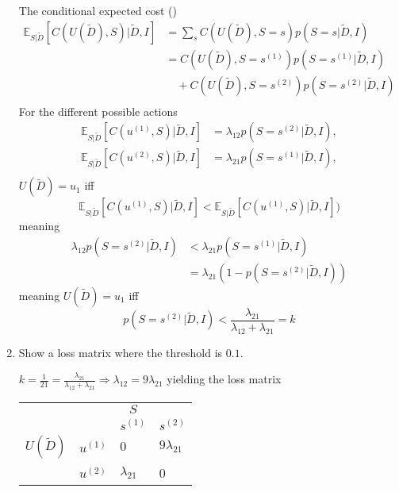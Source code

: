 \begin{example}
\begin{enumerate}
		The conditional expected cost ()
		\begin{equation}
			\begin{split}
				\mathbb{E}_{S|\tilde{D}}[C(U(\tilde{D}), S)|\tilde{D},I] & = \sum_sC(U(\tilde{D}),S=s)p(S=s|\tilde{D},I)\\
				& = C(U(\tilde{D}),S=s^{(1)})p(S=s^{(1)}|\tilde{D},I)\\
				& \quad+C(U(\tilde{D}),S=s^{(2)})p(S=s^{(2)}|\tilde{D},I)\\
			\end{split}
		\end{equation}
		For the different possible actions
		\begin{equation}
			\begin{split}
				\mathbb{E}_{S|\tilde{D}}[C(u^{(1)}, S)|\tilde{D},I] &= \lambda_{12}p(S=s^{(2)}|\tilde{D},I),\\
				\mathbb{E}_{S|\tilde{D}}[C(u^{(2)}, S)|\tilde{D},I] &= \lambda_{21}p(S=s^{(1)}|\tilde{D},I),\\
			\end{split}
		\end{equation}
		$U(\tilde{D})=u_1$ iff
		\begin{equation}
			\mathbb{E}_{S|\tilde{D}}[C(u^{(1)},S)|\tilde{D},I]<\mathbb{E}_{S|\tilde{D}}[C(u^{(1)},S)|\tilde{D},I])
		\end{equation}
		meaning
		\begin{equation}
			\begin{split}
				\lambda_{12}p(S=s^{(2)}|\tilde{D},I)&<\lambda_{21}p(S = s^{(1)}|\tilde{D},I)\\
				&=\lambda_{21}(1-p(S =s^{(2)}|\tilde{D},I))
			\end{split}
		\end{equation}
		meaning $U(\tilde{D}) = u_1$ iff
		\begin{equation}
			p(S=s^{(2)}|\tilde{D},I)<\frac{\lambda_{21}}{\lambda_{12}+\lambda_{21}}=k
		\end{equation}
		
		
		\item Show a loss matrix where the threshold is $0.1$.\newline
		
		$k = \frac{1}{21}=\frac{\lambda_{21}}{\lambda_{12}+\lambda_{21}} \Rightarrow \lambda_{12}=9\lambda_{21}$ yielding the loss matrix
		
		\begin{center}
			\begin{tabular}{ c  c  c  c }
				&& $S$& \\
				&& $s^{(1)}$ & $s^{(2)}$  \\
				\cline{3-4}
				$U(\tilde{D})$ & $u^{(1)}$& \multicolumn{1}{|l}{$0$} &\multicolumn{1}{l|}{$9\lambda_{21}$}  \\
				& $u^{(2)}$& \multicolumn{1}{|l}{$\lambda_{21}$} & \multicolumn{1}{l|}{0} \\
				\cline{3-4}
			\end{tabular}
		\end{center}
		

\end{enumerate}
\end{example}
